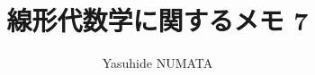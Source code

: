 \documentclass[tombow,dvipdfmx]{jsbook}
\theoremstyle{plain}
\theoremstyle{japanese}
\theoremstyle{remark}
\theoremstyle{japanese}
\theoremstyle{definition}
\theoremstyle{japanese}
\theoremstyle{definition}
\theoremstyle{numberedproof}
\theoremstyle{japanesenumberedproof}
\begin{document}
\title{線形代数学に関するメモ 7}

\author{Yasuhide NUMATA}

\maketitle




%

%


%
%
%

{\printindex}
\end{document}
